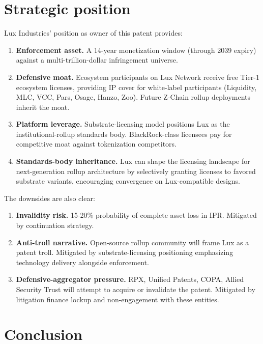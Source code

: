 \documentclass[11pt,letterpaper]{article}
\begin{document}
\section{Strategic position}

Lux Industries' position as owner of this patent provides:

\begin{enumerate}
\item \textbf{Enforcement asset.} A 14-year monetization window (through 2039 expiry) against a multi-trillion-dollar infringement universe.
\item \textbf{Defensive moat.} Ecosystem participants on Lux Network receive free Tier-1 ecosystem licenses, providing IP cover for white-label participants (Liquidity, MLC, VCC, Pars, Osage, Hanzo, Zoo). Future Z-Chain rollup deployments inherit the moat.
\item \textbf{Platform leverage.} Substrate-licensing model positions Lux as the institutional-rollup standards body. BlackRock-class licensees pay for competitive moat against tokenization competitors.
\item \textbf{Standards-body inheritance.} Lux can shape the licensing landscape for next-generation rollup architecture by selectively granting licenses to favored substrate variants, encouraging convergence on Lux-compatible designs.
\end{enumerate}

The downsides are also clear:

\begin{enumerate}
\item \textbf{Invalidity risk.} 15-20\% probability of complete asset loss in IPR. Mitigated by continuation strategy.
\item \textbf{Anti-troll narrative.} Open-source rollup community will frame Lux as a patent troll. Mitigated by substrate-licensing positioning emphasizing technology delivery alongside enforcement.
\item \textbf{Defensive-aggregator pressure.} RPX, Unified Patents, COPA, Allied Security Trust will attempt to acquire or invalidate the patent. Mitigated by litigation finance lockup and non-engagement with these entities.
\end{enumerate}

\section{Conclusion}
\end{document}
